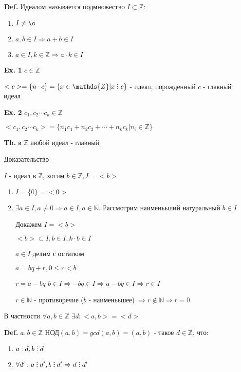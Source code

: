 \documentclass[14pt, letter paper]{article}
\def\divby{%
  \mathrel{\text{\vbox{\baselineskip.65ex\lineskiplimit0pt\hbox{.}\hbox{.}\hbox{.}}}}%
}
\begin{document}
\textbf{Def.} Идеалом называется подмножество $I \subset \mathds{Z}$:
\begin{enumerate}
    \item $I \neq \o$
    \item $a, b \in I \Rightarrow a + b \in I$
    \item $a \in I, k \in \mathds{Z} \Rightarrow a \cdot k \in I$
\end{enumerate}

\textbf{Ex. 1} $c \in \mathds{Z}$

$<c> = \{n \cdot c\} = \{ x \in \mathds{Z} | x \divby c\}$ - идеал, порожденный $c$ - главный идеал

\textbf{Ex. 2} $c_1, c_2 \cdots c_k \in \mathds{Z}$

$<c_1, c_2 \cdots c_k> = \{n_1 c_1 + n_2 c_2 + \cdots + n_k c_k | n_i \in \mathds{Z} \}$

{\textbf{Th.} в $\mathds{Z}$ любой идеал - главный}

\begin{center}
    Доказательство
\end{center}

$I$ - идеал в $\mathds{Z}$, хотим $b \in \mathds{Z}, I = <b>$

\begin{enumerate}
    \item $I = \{0\} = <0>$
    \item $\exists a \in I, a \neq 0 \Rightarrow a \in I, a \in \mathds{N}$. Рассмотрим наименььший натуральный $b \in I$

    Докажем $I = <b>$

    $<b> \subset I, b \in I, k \cdot b \in I$

    $a \in I$ делим с остатком

    $a = bq + r, 0 \leq r < b$

    $r = a - bq$ $b \in I \Rightarrow -bq \in I \Rightarrow a - bq \in I \Rightarrow r \in I$

    $r \in \mathds{N}$ - противоречие ($b$ - наименььшее) $\Rightarrow r \notin \mathds{N} \Rightarrow r = 0$
\end{enumerate}

В частности $\forall a, b \in \mathds{Z}$ $\exists d: <a, b> = <d>$

\textbf{Def.} $a, b \in \mathds{Z}$ НОД$(a, b) = gcd(a, b) = (a, b)$ - такое $d \in \mathds{Z}$, что:
\begin{enumerate}
    \item $a \divby d, b \divby d$
    \item $\forall d': a \divby d', b \divby d' \Rightarrow d \divby d'$
\end{enumerate}
\end{document}
